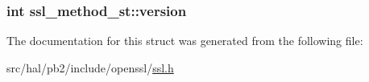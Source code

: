 \subsubsection[{\texorpdfstring{version}{version}}]{\setlength{\rightskip}{0pt plus 5cm}int ssl\+\_\+method\+\_\+st\+::version}\hypertarget{structssl__method__st_a1d231051899c943c03267d9ede6d2488}{}\label{structssl__method__st_a1d231051899c943c03267d9ede6d2488}


The documentation for this struct was generated from the following file\+:\begin{DoxyCompactItemize}
\item 
src/hal/pb2/include/openssl/\hyperlink{ssl_8h}{ssl.\+h}\end{DoxyCompactItemize}
